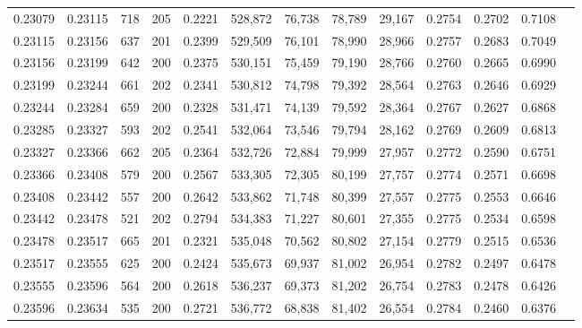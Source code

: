 \begin{tabular}{rrrrrrrrrrrrr}
0.23079 & 0.23115 &   718 & 205 &                                     0.2221 & 528,872 &  76,738 &  78,789 &  29,167 & 0.2754 & 0.2702 & 0.7108 \\
0.23115 & 0.23156 &   637 & 201 &                                     0.2399 & 529,509 &  76,101 &  78,990 &  28,966 & 0.2757 & 0.2683 & 0.7049 \\
0.23156 & 0.23199 &   642 & 200 &                                     0.2375 & 530,151 &  75,459 &  79,190 &  28,766 & 0.2760 & 0.2665 & 0.6990 \\
0.23199 & 0.23244 &   661 & 202 &                                     0.2341 & 530,812 &  74,798 &  79,392 &  28,564 & 0.2763 & 0.2646 & 0.6929 \\
0.23244 & 0.23284 &   659 & 200 &                                     0.2328 & 531,471 &  74,139 &  79,592 &  28,364 & 0.2767 & 0.2627 & 0.6868 \\
0.23285 & 0.23327 &   593 & 202 &                                     0.2541 & 532,064 &  73,546 &  79,794 &  28,162 & 0.2769 & 0.2609 & 0.6813 \\
0.23327 & 0.23366 &   662 & 205 &                                     0.2364 & 532,726 &  72,884 &  79,999 &  27,957 & 0.2772 & 0.2590 & 0.6751 \\
0.23366 & 0.23408 &   579 & 200 &                                     0.2567 & 533,305 &  72,305 &  80,199 &  27,757 & 0.2774 & 0.2571 & 0.6698 \\
0.23408 & 0.23442 &   557 & 200 &                                     0.2642 & 533,862 &  71,748 &  80,399 &  27,557 & 0.2775 & 0.2553 & 0.6646 \\
0.23442 & 0.23478 &   521 & 202 &                                     0.2794 & 534,383 &  71,227 &  80,601 &  27,355 & 0.2775 & 0.2534 & 0.6598 \\
0.23478 & 0.23517 &   665 & 201 &                                     0.2321 & 535,048 &  70,562 &  80,802 &  27,154 & 0.2779 & 0.2515 & 0.6536 \\
0.23517 & 0.23555 &   625 & 200 &                                     0.2424 & 535,673 &  69,937 &  81,002 &  26,954 & 0.2782 & 0.2497 & 0.6478 \\
0.23555 & 0.23596 &   564 & 200 &                                     0.2618 & 536,237 &  69,373 &  81,202 &  26,754 & 0.2783 & 0.2478 & 0.6426 \\
0.23596 & 0.23634 &   535 & 200 &                                     0.2721 & 536,772 &  68,838 &  81,402 &  26,554 & 0.2784 & 0.2460 & 0.6376 \\

\end{tabular}

